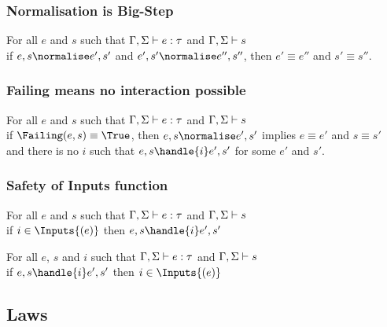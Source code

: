 \subsubsection{Normalisation is Big-Step}

\begin{theorem}
  For all $e$ and $s$ such that $\Gamma,\Sigma\vdash e:\tau$ and $\Gamma,\Sigma\vdash s$\\
  if $e,s\normalise e',s'$ and $e',s'\normalise e'',s''$, then $e'\equiv e''$ and $s'\equiv s''$.
\end{theorem}

\subsubsection{Failing means no interaction possible}

\begin{theorem}
  For all $e$ and $s$ such that $\Gamma,\Sigma\vdash e:\tau$ and $\Gamma,\Sigma\vdash s$\\
  if $\Failing(e,s)\equiv \True$, then $e,s\normalise e',s'$ implies $e\equiv e'$ and $s\equiv s'$\\
  and there is no $i$ such that $e,s\handle{i}e',s'$ for some $e'$ and $s'$.
\end{theorem}


\subsubsection{Safety of Inputs function}

\begin{theorem}
  For all $e$ and $s$ such that $\Gamma,\Sigma\vdash e:\tau$ and $\Gamma,\Sigma\vdash s$\\
  if $i\in\Inputs{(e)}$ then $e,s\handle{i}e',s'$
  \label{thmsafetyi1}
\end{theorem}

\begin{theorem}
  For all $e$, $s$ and $i$ such that $\Gamma,\Sigma\vdash e:\tau$ and $\Gamma,\Sigma\vdash s$\\
  if $e,s\handle{i}e',s'$ then  $i\in\Inputs{(e)}$
  \label{thmsafetyi2}
\end{theorem}
\subsection{Laws}
